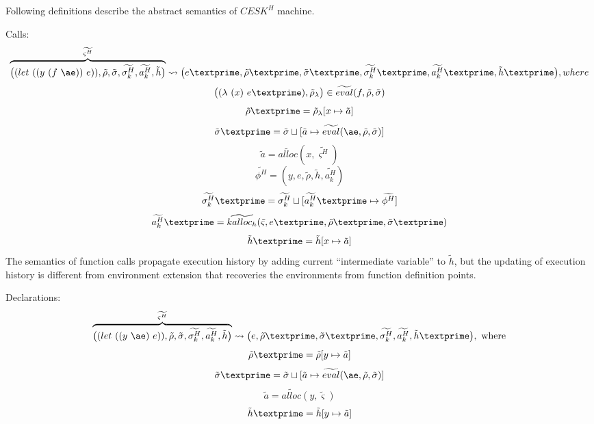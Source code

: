\documentclass{article}
\begin{document}
Following definitions describe the abstract semantics of $CESK^H$ machine.

Calls:
\[
\overbrace{
\big((let\ ((y\ (f\ \ae))\ e)), \tilde{\rho}, \tilde{\sigma}, \widetilde{\sigma^H_k}, \widetilde{a^H_k}, \tilde{h} \big)
}^{\widetilde{\varsigma^H}}
\leadsto \big(e\textprime,\tilde{\rho}\textprime, \tilde{\sigma}\textprime, \widetilde{\sigma_k^H}\textprime, \widetilde{a_k^H}\textprime, \tilde{h}\textprime \big), where
\]
\[
\big((\lambda\ (x)\ e\textprime), \tilde{\rho}_{\lambda}  \big) \in \widetilde{eval}(f, \tilde{\rho}, \tilde{\sigma})
\]
\[
\tilde{\rho}\textprime = \tilde{\rho}_{\lambda}[x \mapsto \tilde{a}]
\]
\[
\tilde{\sigma}\textprime = \tilde{\sigma} \sqcup [\tilde{a} \mapsto \widetilde{eval}(\ae, \tilde{\rho}, \tilde{\sigma})]
\]
\[
\tilde{a} = \widetilde{alloc}(x, \widetilde{\varsigma^H})
\]
\[
\widetilde{\phi^H} = {(y, e, \tilde{\rho}, \tilde{h}, \widetilde{a_k^H})}
\]
\[
\widetilde{\sigma_k^H}\textprime = \widetilde{\sigma_k^H} \sqcup [\widetilde{a_k^H}\textprime \mapsto \widetilde{\phi^H}]
\]
\[
\widetilde{a_k^H}\textprime = \widetilde{kalloc_h}(\tilde{\varsigma}, e\textprime, \tilde{\rho}\textprime, \tilde{\sigma}\textprime)
\]
\[
\tilde{h}\textprime = \tilde{h}[x \mapsto \tilde{a}]
\]
The semantics of function calls propagate execution history by adding current ``intermediate variable'' to $\tilde{h}$, but the updating of execution history is different from environment extension that recoveries the environments from function definition points.

Declarations:
\[
\overbrace{
\big((let\ ((y\ \ae)\ e)), \tilde{\rho}, \tilde{\sigma}, \widetilde{\sigma^H_k}, \widetilde{a^H_k}, \tilde{h} \big)
}^{\widetilde{\varsigma^H}}
\leadsto \big(e,\tilde{\rho}\textprime, \tilde{\sigma}\textprime, \widetilde{\sigma^H_k}, \widetilde{a^H_k}, \tilde{h}\textprime \big), \mbox{ where}
\]
\[
\tilde{\rho}\textprime = \tilde{\rho}[y \mapsto \tilde{a}]
\]
\[
\tilde{\sigma}\textprime = \tilde{\sigma} \sqcup [\tilde{a} \mapsto \widetilde{eval}(\ae, \tilde{\rho}, \tilde{\sigma})]
\]
\[
\tilde{a} = \widetilde{alloc}(y, \tilde{\varsigma})
\]
\[
\tilde{h}\textprime = \tilde{h}[y \mapsto \tilde{a}]
\]
\end{document}
